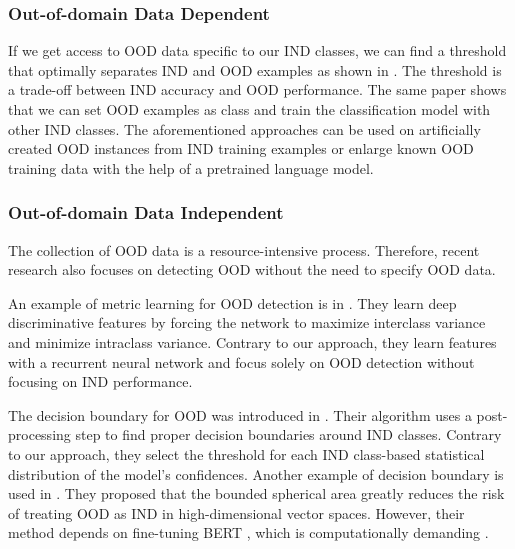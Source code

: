 \documentclass[runningheads]{llncs}
\begin{document}
\subsubsection{Out-of-domain Data Dependent}

If we get access to OOD data specific to our IND classes, we can find a threshold that optimally separates IND and OOD examples as shown in \cite{larson2019evaluation_clinc_dataset}. The threshold is a trade-off between IND accuracy and OOD performance. The same paper shows that we can set OOD examples as  class and train the classification model with other IND classes. The aforementioned approaches can be used on artificially created OOD instances from IND training examples \cite{odist} or enlarge known OOD training data \cite{chen2021gold} with the help of a pretrained language model. 

\subsubsection{Out-of-domain Data Independent}

The collection of OOD data is a resource-intensive process. Therefore, recent research also focuses on detecting OOD without the need to specify OOD data. 

An example of metric learning for OOD detection is in \cite{lin2019margin_loss}. They learn deep discriminative features by forcing the network to maximize interclass variance and minimize intraclass variance. Contrary to our approach, they learn features with a recurrent neural network and focus solely on OOD detection without focusing on IND performance.

The decision boundary for OOD was introduced in \cite{shu2017doc}. Their algorithm uses a post-processing step to find proper decision boundaries around IND classes. Contrary to our approach, they select the threshold for each IND class-based statistical distribution of the model's confidences. Another example of decision boundary is used in \cite{zhang2021adaptive_decision_boundary}. They proposed that the bounded spherical area greatly reduces the risk of treating OOD as IND in high-dimensional vector spaces. However, their method depends on fine-tuning BERT \cite{devlin2019bert}, which is computationally demanding \cite{reimers2019sentencebert}.
\end{document}
